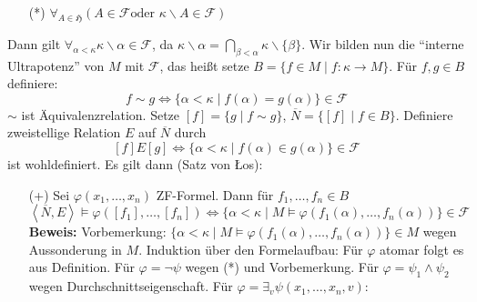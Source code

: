 \documentclass[a4paper,fontsize=11pt]{scrartcl}
\begin{document}
\begin{itemize}
      \begin{itemize}
        \item[(*)] $\forall_{A\in\mathfrak{H}}(A\in\mathcal{F}\mbox{
          oder }\kappa\backslash A\in\mathcal{F})$ \newline [beachte:
          gilt ``entweder oder'', da sonst
          $\emptyset=A\cap(\kappa\backslash A)\in\mathcal{F}$]
      \end{itemize}
      Dann gilt $\forall_{\alpha<\kappa}
      \kappa\backslash\alpha\in\mathcal{F}$, da
      $\kappa\backslash\alpha=
      \bigcap\limits_{\beta<\alpha}\kappa\backslash\{\beta\}$. Wir
      bilden nun die ``interne Ultrapotenz'' von $M$ mit
      $\mathcal{F}$, das heißt setze $B=\{f\in M\mid f:\kappa\rightarrow
      M\}$. Für $f,g\in B$ definiere:
      $$ f \sim g \Leftrightarrow
      \{\alpha<\kappa\mid f(\alpha)=g(\alpha)\}\in\mathcal{F} $$ $\sim$
      ist Äquivalenzrelation. Setze $[f]=\{g\mid f\sim g\}$,
      $\overline{N}=\{[f]\mid f\in B\}$. Definiere zweistellige Relation
      $E$ auf $\overline{N}$ durch
      $$ [f]E[g]\Leftrightarrow\{\alpha<\kappa\mid f(\alpha)\in
      g(\alpha)\}\in\mathcal{F} $$ ist wohldefiniert.  Es gilt dann
      (Satz von Łos):
      \begin{itemize}
        \item[(+)] Sei $\varphi(x_1,\ldots,x_n)$ ZF-Formel. Dann für
          $f_1,\ldots,f_n\in B$
          $$ \left<\overline{N},E\right>\models
          \varphi([f_1],\ldots,[f_n])\Leftrightarrow
          \{\alpha<\kappa\mid M\models
          \varphi(f_1(\alpha),\ldots,f_n(\alpha))\}\in\mathcal{F} $$
                 {\bf Beweis:} Vorbemerkung: $\{\alpha<\kappa\mid M\models
                 \varphi(f_1(\alpha),\ldots,f_n(\alpha))\}\in M$ wegen
                 Aussonderung in $M$. \newline Induktion über den
                 Formelaufbau: Für $\varphi$ atomar folgt es aus
                 Definition. Für $\varphi=\lnot\psi$ wegen (*) und
                 Vorbemerkung. Für $\varphi=\psi_1\wedge\psi_2$ wegen
                 Durchschnittseigenschaft. Für
                 $\varphi=\exists_v\psi(x_1,\ldots,x_n,v)$:
\end{itemize}
\end{itemize}
\end{document}
